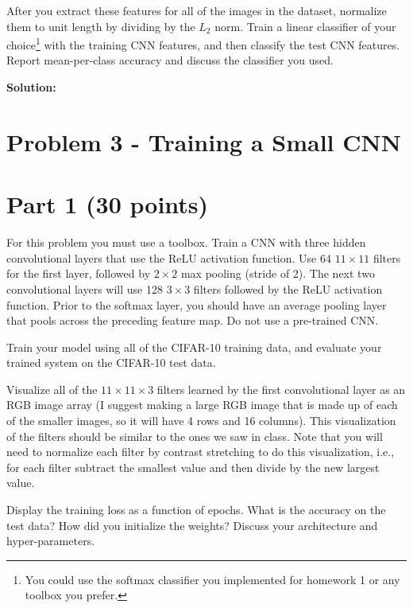 \documentclass[11pt, oneside]{article}   	%
\begin{document}
After you extract these features for all of the images in the dataset, normalize them to unit length by dividing by the $L_2$ norm. Train a linear classifier of your choice\footnote{You could use the softmax classifier you implemented for homework 1 or any toolbox you prefer.} with the training CNN features, and then classify the test CNN features. Report mean-per-class accuracy and discuss the classifier you used. 



\textbf{Solution:}\\



\section*{Problem 3 - Training a Small CNN}

\section*{Part 1 (30 points)}

For this problem you must use a toolbox. Train a CNN with three hidden convolutional layers that use the ReLU activation function. Use 64 $11\times 11$ filters for the first layer, followed by $2 \times 2$ max pooling (stride of 2). The next two convolutional layers will use 128 $3 \times 3$ filters followed by the ReLU activation function. Prior to the softmax layer, you should have an average pooling layer that pools across the preceding feature map. Do not use a pre-trained CNN.

Train your model using all of the CIFAR-10 training data, and evaluate your trained system on the CIFAR-10 test data.

Visualize all of the $11 \times 11 \times 3$ filters learned by the first convolutional layer as an RGB image array (I suggest making a large RGB image that is made up of each of the smaller images, so it will have 4 rows and 16 columns). This visualization of the filters should be similar to the ones we saw in class. Note that you will need to normalize each filter by contrast stretching to do this visualization, i.e., for each filter subtract the smallest value and then divide by the new largest value.

Display the training loss as a function of epochs. What is the accuracy on the test data? How did you initialize the weights? Discuss your architecture and hyper-parameters.
\end{document}
